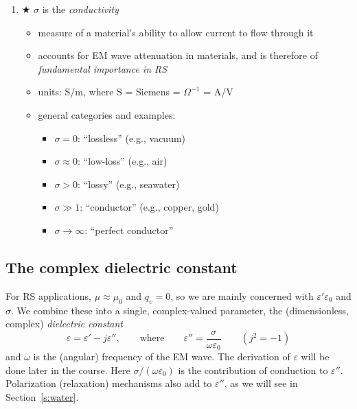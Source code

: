 \documentclass[11pt, oneside]{article}
\begin{document}
\begin{enumerate}
\begin{itemize}
		\item $c = 1/\sqrt{\mu_0\varepsilon_0}$ is the speed of light in a vacuum
	\end{itemize}
	\item $\bigstar$ $\sigma$ is the \emph{conductivity}
	\begin{itemize}
		\item measure of a material's ability to allow current to flow through it
		\item accounts for EM wave attenuation in materials, and is therefore of \emph{fundamental importance in RS}
		\item units: S/m, where S = Siemens = $\Omega^{-1}$ = A/V
		\item general categories and examples:
		\begin{itemize}
			\item $\sigma = 0$: ``lossless'' (e.g., vacuum)
			\item $\sigma \approx 0$: ``low-loss'' (e.g., air)
			\item $\sigma > 0$: ``lossy'' (e.g., seawater)
			\item $\sigma \gg 1$: ``conductor'' (e.g., copper, gold)
			\item $\sigma \to \infty$: ``perfect conductor''
		\end{itemize}
	\end{itemize}
\end{enumerate}

\subsection{The complex dielectric constant}

For RS applications, $\mu \approx \mu_0$ and $q_v = 0$, so we are mainly concerned with $\varepsilon'\varepsilon_0$ and $\sigma$. We combine these into a single, complex-valued parameter, the (dimensionless, complex) \emph{dielectric constant}
\begin{equation}
	\label{e:dielectric}
	\varepsilon = \varepsilon' - j\varepsilon'', \qquad \text{where} \qquad \varepsilon'' = \frac{\sigma}{\omega\varepsilon_0} \qquad (j^2 = -1)
\end{equation}
and $\omega$ is the (angular) frequency of the EM wave. The derivation of $\varepsilon$ will be done later in the course.
Here $\sigma/(\omega\varepsilon_0)$ is the contribution of conduction to $\varepsilon''$. Polarization (relaxation) mechanisms also add to $\varepsilon''$, as we will see in Section~\ref{s:water}.
\end{document}
